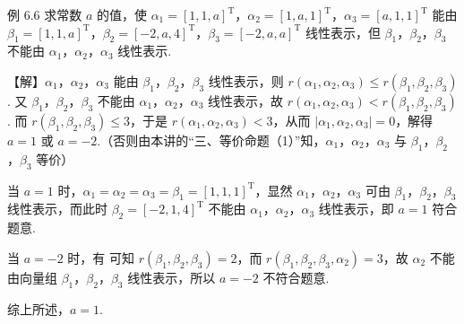 \begin{fcard}{例 6.6}
求常数 $a$ 的值，使 $\alpha_1=[1,1,a]^{\mathrm T}$，$\alpha_2=[1,a,1]^{\mathrm T}$，$\alpha_3=[a,1,1]^{\mathrm T}$ 能由 $\beta_1=[1,1,a]^{\mathrm T}$，$\beta_2=[-2,a,4]^{\mathrm T}$，$\beta_3=[-2,a,a]^{\mathrm T}$ 线性表示，但 $\beta_1$，$\beta_2$，$\beta_3$ 不能由 $\alpha_1$，$\alpha_2$，$\alpha_3$ 线性表示.

【解】$\alpha_1$，$\alpha_2$，$\alpha_3$ 能由 $\beta_1$，$\beta_2$，$\beta_3$ 线性表示，则 $r(\alpha_1,\alpha_2,\alpha_3)\le r(\beta_1,\beta_2,\beta_3)$. 又 $\beta_1$，$\beta_2$，$\beta_3$ 不能由 $\alpha_1$，$\alpha_2$，$\alpha_3$ 线性表示，故 $r(\alpha_1,\alpha_2,\alpha_3)<r(\beta_1,\beta_2,\beta_3)$. 而 $r(\beta_1,\beta_2,\beta_3)\le3$，于是 $r(\alpha_1,\alpha_2,\alpha_3)<3$，从而 $|\alpha_1,\alpha_2,\alpha_3|=0$，解得 $a=1$ 或 $a=-2$.（否则由本讲的“三、等价命题（1）”知，$\alpha_1$，$\alpha_2$，$\alpha_3$ 与 $\beta_1$，$\beta_2$，$\beta_3$ 等价）

当 $a=1$ 时，$\alpha_1=\alpha_2=\alpha_3=\beta_1=[1,1,1]^{\mathrm T}$，显然 $\alpha_1$，$\alpha_2$，$\alpha_3$ 可由 $\beta_1$，$\beta_2$，$\beta_3$ 线性表示，而此时 $\beta_2=[-2,1,4]^{\mathrm T}$ 不能由 $\alpha_1$，$\alpha_2$，$\alpha_3$ 线性表示，即 $a=1$ 符合题意.

当 $a=-2$ 时，有
可知 $r(\beta_1,\beta_2,\beta_3)=2$，而 $r(\beta_1,\beta_2,\beta_3,\alpha_2)=3$，故 $\alpha_2$ 不能由向量组 $\beta_1$，$\beta_2$，$\beta_3$ 线性表示，所以 $a=-2$ 不符合题意.

综上所述，$a=1$.
\end{fcard}


